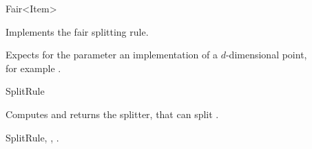 

\begin{ccRefFunctionObjectClass}{Fair<Item>}  %


\begin{ccAdvanced}

\ccDefinition
Implements the fair splitting rule.

\ccParameters

Expects for the parameter  an implementation of a $d$-dimensional point,\\
for example .


\ccIsModel

SplitRule

\ccTypes


\ccCreation
{}  %



{Computes and returns the splitter, that can split .}

\ccSeeAlso

SplitRule,
,
.

\end{ccAdvanced}

\end{ccRefFunctionObjectClass}


